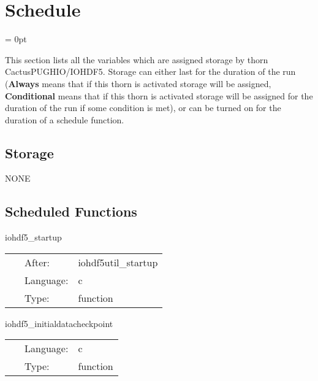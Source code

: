 
\section{Schedule} 


\parskip = 0pt


\noindent This section lists all the variables which are assigned storage by thorn CactusPUGHIO/IOHDF5.  Storage can either last for the duration of the run ({\bf Always} means that if this thorn is activated storage will be assigned, {\bf Conditional} means that if this thorn is activated storage will be assigned for the duration of the run if some condition is met), or can be turned on for the duration of a schedule function.


\subsection*{Storage}NONE
\subsection*{Scheduled Functions}
\vspace{5mm}


\hspace{5mm} iohdf5\_startup 

\hspace{5mm}{\it iohdf5 startup routine } 


\hspace{5mm}

 \begin{tabular*}{160mm}{cll} 
~ & After:  & iohdf5util\_startup \\ 
~ & Language:  & c \\ 
~ & Type:  & function \\ 
\end{tabular*} 


\vspace{5mm}


\hspace{5mm} iohdf5\_initialdatacheckpoint 

\hspace{5mm}{\it initial data checkpoint routine } 


\hspace{5mm}

 \begin{tabular*}{160mm}{cll} 
~ & Language:  & c \\ 
~ & Type:  & function \\ 
\end{tabular*} 


